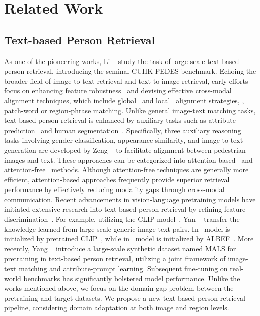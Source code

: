 \section{Related Work}
\subsection{Text-based Person Retrieval}
\noindent As one of the pioneering works, Li \etal~\cite{li2017person} study the task of large-scale text-based person retrieval, introducing the seminal CUHK-PEDES benchmark. 
Echoing the broader field of image-to-text retrieval and text-to-image retrieval, early efforts focus on enhancing feature robustness~\cite{ zhang2018deep} and devising effective cross-modal alignment techniques, which include global~\cite{zheng2020dual} and local~\cite{ZHANG2025111247} alignment strategies, \eg, patch-word or region-phrase matching.
Unlike general image-text matching tasks, text-based person retrieval is enhanced by auxiliary tasks such as attribute prediction~\cite{lin2019improving} and human segmentation~\cite{wang2020vitaa}.
Specifically, three auxiliary reasoning tasks involving gender classification, appearance similarity, and image-to-text generation are developed by Zeng \etal~\cite{zeng2021relation} to facilitate alignment between pedestrian images and text. 
These approaches can be categorized into attention-based~\cite{wang2022look} and attention-free~\cite{wang2022caibc} methods.
Although attention-free techniques are generally more efficient, attention-based approaches frequently provide superior retrieval performance by effectively reducing modality gaps through cross-modal communication. 
Recent advancements in vision-language pretraining models have initiated extensive research into text-based person retrieval by refining feature discrimination~\cite{shu2022see}.
For example, utilizing the CLIP model~\cite{radford2021learning}, Yan \etal~\cite{yan2022clip} transfer the knowledge learned from large-scale generic image-text pairs. 
In~\cite{jiang2023cross} model is initialized by pretrained CLIP~\cite{radford2021learning}, while in~\cite{bai2023rasa} model is initialized by ALBEF~\cite{li2021align}. 
More recently, Yang \etal~\cite{yang2023towards} introduce a large-scale synthetic dataset named MALS for pretraining in text-based person retrieval, utilizing a joint framework of image-text matching and attribute-prompt learning. 
Subsequent fine-tuning on real-world benchmarks has significantly bolstered model performance.
Unlike the works mentioned above, we focus on the domain gap problem between the pretraining and target datasets. We propose a new text-based person retrieval pipeline, considering domain adaptation at both image and region levels.
